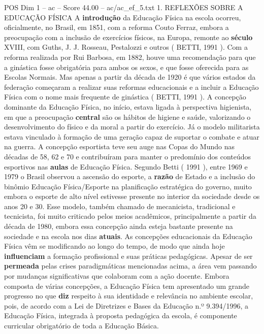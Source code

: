 \begin{textsample}{POS Dim 1 – ac – Score 44.00 – ac/ac\_ef\_5.txt}  \label{ex:f1_pos_176}
1.
REFLEXÕES SOBRE A EDUCAÇÃO FÍSICA A \textbf{introdução} da Educação Física na escola ocorreu, oficialmente, no Brasil, em 1851, com a reforma Couto Ferraz, embora a preocupação com a inclusão de exercícios físicos, na Europa, remonte ao \textbf{século} XVIII, com Guths, J.
J.
Rosseau, Pestalozzi e outros ( BETTI, 1991 ).
Com a reforma realizada por Rui Barbosa, em 1882, houve uma recomendação para que a ginástica fosse obrigatória para ambos os sexos, e que fosse oferecida para as Escolas Normais.
Mas apenas a partir da década de 1920 é que vários estados da federação começaram a realizar suas reformas educacionais e a incluir a Educação Física com o nome mais frequente de ginástica ( BETTI, 1991 ).
A concepção dominante da Educação Física, no início, estava ligada à perspectiva higienista, em que a preocupação \textbf{central} são os hábitos de higiene e saúde, valorizando o desenvolvimento do físico e da moral a partir do exercício.
Já o modelo militarista estava vinculado à formação de uma geração capaz de suportar o combate e atuar na guerra.
A concepção esportista teve seu auge nas Copas do Mundo nas décadas de 58, 62 e 70 e contribuíram para manter o predomínio dos conteúdos esportivos nas \textbf{aulas} de Educação Física.
Segundo Betti ( 1991 ), entre 1969 e 1979 o Brasil observou a ascensão do esporte, a \textbf{razão} de Estado e a inclusão do binômio Educação Física/Esporte na planificação estratégica do governo, muito embora o esporte de alto nível estivesse presente no interior da sociedade desde os anos 20 e 30.
Esse modelo, também chamado de mecanicista, tradicional e tecnicista, foi muito criticado pelos meios acadêmicos, principalmente a partir da década de 1980, embora essa concepção ainda esteja bastante presente na sociedade e na escola nos dias \textbf{atuais}.
As concepções educacionais da Educação Física vêm se modificando ao longo do tempo, de modo que ainda hoje \textbf{influenciam} a formação profissional e suas práticas pedagógicas.
Apesar de ser \textbf{permeada} pelas crises paradigmáticas mencionadas acima, a área vem passando por mudanças significativas que colaboram com a ação docente.
Embora composta de várias concepções, a Educação Física tem apresentado um grande progresso no que \textbf{diz} respeito à sua identidade e relevância no ambiente escolar, pois, de acordo com a Lei de Diretrizes e Bases da Educação n.º 9.394/1996, a Educação Física, integrada à proposta pedagógica da escola, é componente curricular obrigatório de toda a Educação Básica.

\end{textsample}
